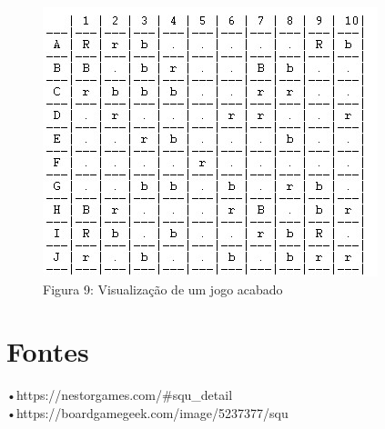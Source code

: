 \documentclass[11pt]{article}
\begin{document}
\begin{figure}[h]
 \begin{center}
\includegraphics[scale=0.7]{fig9.jpg}
\caption*{Figura 9: Visualização de um jogo acabado}
\end{center}
\end{figure}

\section*{Fontes}
\setlength{\parindent}{} 
•https://nestorgames.com/#squ\_detail \\
•https://boardgamegeek.com/image/5237377/squ
\end{document}
